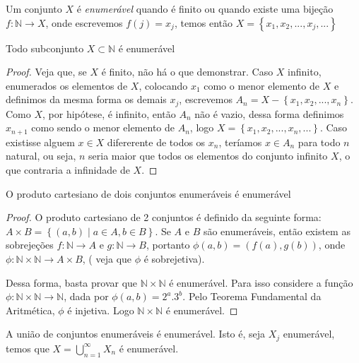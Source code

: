 Um conjunto $X$ é \textit{enumerável} quando é finito ou quando existe uma bijeção $f: \mathbb{N} \rightarrow X$, onde escrevemos $f(j)=x_{j}$, temos então $X=\left \{ x_{1},x_{2},...,x_{j},... \right \}$

\begin{theorem}
Todo subconjunto $X \subset \mathbb{N}$ é enumerável
\end{theorem}

\begin{proof}
Veja que, se $X$ é finito, não há o que demonstrar. Caso $X$ infinito, enumerados os elementos de $X$, colocando $x_{1}$ como o menor elemento de $X$ e definimos da mesma forma os demais $x_{j}$, escrevemos $A_{n}=X-\left \{ x_{1},x_{2},...,x_{n} \right \}$. Como $X$, por hipótese, é infinito, então $A_{n}$ não é vazio, dessa forma definimos $x_{n+1}$ como sendo o menor elemento de $A_{n}$, logo $X=\left \{ x_{1},x_{2},...,x_{n},... \right \}$. Caso existisse alguem $x \in X$ difererente de todos os $x_{n}$, teríamos $x \in A_{n}$ para todo $n$ natural, ou seja, $n$ seria maior que todos os elementos do conjunto infinito $X$, o que contraria a infinidade de $X$. 
\end{proof}

\begin{corol}
O produto cartesiano de dois conjuntos enumeráveis é enumerável
\end{corol}

\begin{proof}
O produto cartesiano de 2 conjuntos é definido da seguinte forma: $A\times B=\left \{ (a,b) \mid a \in A, b \in B \right \}$. Se $A$ e $B$ são enumeráveis, então existem as sobrejeções $f:\mathbb{N}\rightarrow A$ e $g:\mathbb{N}\rightarrow B$, portanto $\phi (a,b)=(f(a),g(b))$, onde $\phi: \mathbb{N}\times \mathbb{N}\rightarrow A\times B$, ( veja que $\phi$ é sobrejetiva).

Dessa forma, basta provar que $\mathbb{N}\times \mathbb{N}$ é enumerável. Para isso considere a função $\phi:\mathbb{N}\times \mathbb{N} \rightarrow \mathbb{N}$, dada por $\phi(a,b)=2^{a}.3^{b}$. Pelo Teorema Fundamental da Aritmética, $\phi$ é injetiva. Logo $\mathbb{N}\times \mathbb{N}$ é enumerável.
\end{proof}

\begin{corol}
A união de conjuntos enumeráveis é enumerável. Isto é, seja $X_{j}$ enumerável, temos que $X=\bigcup_{n=1}^{\infty }X_{n}$ é enumerável.
\end{corol}

